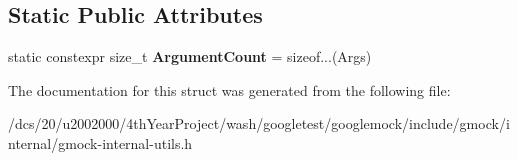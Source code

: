 \subsection*{Static Public Attributes}
\begin{DoxyCompactItemize}
\item 
\mbox{\label{structtesting_1_1internal_1_1Function_3_01R_07Args_8_8_8_08_4_a9fbf56d693d099df9f23ad175ccef781}} 
static constexpr size\+\_\+t {\bfseries Argument\+Count} = sizeof...(Args)
\end{DoxyCompactItemize}


The documentation for this struct was generated from the following file\+:\begin{DoxyCompactItemize}
\item 
/dcs/20/u2002000/4th\+Year\+Project/wash/googletest/googlemock/include/gmock/internal/gmock-\/internal-\/utils.\+h\end{DoxyCompactItemize}
